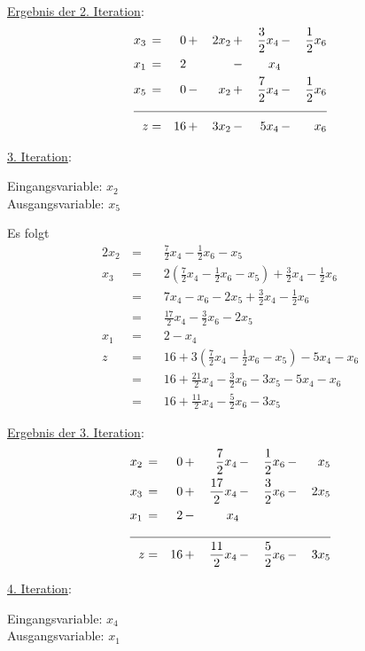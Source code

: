 \documentclass[10pt,a4paper,oneside,ngerman,numbers=noenddot]{scrartcl}
\begin{document}
		\underline{Ergebnis der 2. Iteration}:
		\begin{alignat*}{5}
			x_{3} \,&=&\, 0 \,&+&\, 2x_{2} \,&+&\, \frac{3}{2}x_{4} \,&-&\, \frac{1}{2}x_{6} \\
			x_{1} \,&=&\, 2 \,&& &-&\, x_{4} && \\
			x_{5} \,&=&\, 0 \,&-&\, x_{2} \,&+&\, \frac{7}{2}x_{4} \,&-&\, \frac{1}{2}x_{6} \\ \cline{1 - 9}
			z &=& 16 \,&+&\, 3x_{2} \,&-&\, 5x_{4} \,&-&\, x_{6}
		\end{alignat*}
		
		\underline{3. Iteration}:
		
		Eingangsvariable: $x_{2}$ \\
		Ausgangsvariable: $x_{5}$
		
		Es folgt
		\begin{alignat*}{2}
			x_{2} \,&=&&\, \frac{7}{2}x_{4} - \frac{1}{2}x_{6} - x_{5} \\
			x_{3} \,&=&&\, 2\left(\frac{7}{2}x_{4} - \frac{1}{2}x_{6} - x_{5}\right) + \frac{3}{2}x_{4} - \frac{1}{2}x_{6} \\
			&=&&\, 7x_{4} - x_{6} - 2x_{5} + \frac{3}{2}x_{4} - \frac{1}{2}x_{6} \\
			&=&&\, \frac{17}{2}x_{4} - \frac{3}{2}x_{6} - 2x_{5} \\
			x_{1} \,&=&&\, 2 - x_{4} \\
			z \,&=&&\, 16 + 3\left(\frac{7}{2}x_{4} - \frac{1}{2}x_{6} - x_{5}\right) - 5x_{4} - x_{6}  \\
			&=&&\, 16 + \frac{21}{2}x_{4} - \frac{3}{2}x_{6} - 3x_{5} - 5x_{4} - x_{6} \\
			&=&&\, 16 + \frac{11}{2}x_{4} - \frac{5}{2}x_{6} - 3x_{5} 
		\end{alignat*}
		
		\underline{Ergebnis der 3. Iteration}:
		\begin{alignat*}{5}
			x_{2} \,&=&\, 0 \,&+&\, \frac{7}{2}x_{4} \,&-&\, \frac{1}{2}x_{6} \,&-&\, x_{5} \\
			x_{3} \,&=&\, 0 \,&+&\, \frac{17}{2}x_{4} \,&-&\, \frac{3}{2}x_{6} \,&-&\, 2x_{5} \\
			x_{1} \,&=&\, 2 \,&-&\, x_{4} && && \\ \cline{1 - 9}
			z &=& 16 \,&+&\, \frac{11}{2}x_{4} \,&-&\, \frac{5}{2}x_{6} \,&-&\, 3x_{5}
		\end{alignat*}
		
		\underline{4. Iteration}:
		
		Eingangsvariable: $x_{4}$ \\
		Ausgangsvariable: $x_{1}$
		
\end{document}
